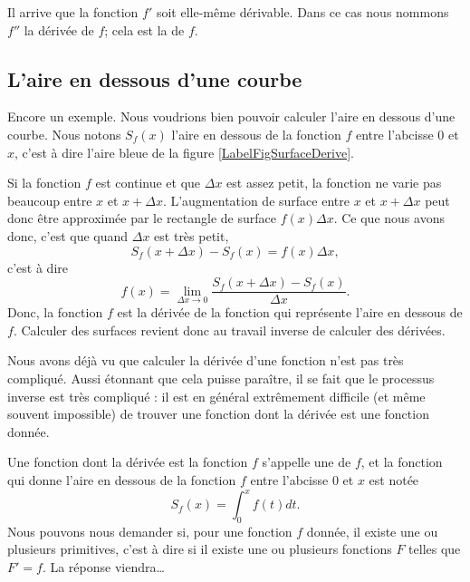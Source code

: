 Il arrive que la fonction $f'$ soit elle-même dérivable. Dans ce cas nous nommons $f''$ la dérivée de $f$; cela est la  de $f$.

\subsection{L'aire en dessous d'une courbe}		\label{SubSecAirePrimIntoOM}

Encore un exemple. Nous voudrions bien pouvoir calculer l'aire en dessous d'une courbe. Nous notons $S_f(x)$ l'aire en dessous de la fonction $f$ entre l'abcisse $0$ et $x$, c'est à dire l'aire bleue de la figure \ref{LabelFigSurfaceDerive}. 

\newcommand{\CaptionFigSurfaceDerive}{L'aire en dessous d'une courbe. Le rectangle rouge d'aire $f(x)\Delta x$ approxime de combien la surface augmente lorsqu'on passe de $x$ à $x+\Delta x$.}



Si la fonction $f$ est continue et que $\Delta x$ est assez petit, la fonction ne varie pas beaucoup entre $x$ et $x+\Delta x$. L'augmentation de surface entre $x$ et $x+\Delta x$ peut donc être approximée par le rectangle de surface $f(x)\Delta x$. Ce que nous avons donc, c'est que quand $\Delta x$ est très petit,
\begin{equation}
	S_f(x+\Delta x)-S_f(x)=f(x)\Delta x,
\end{equation}
c'est à dire
\begin{equation}
	f(x)=\lim_{\Delta x\to 0}\frac{  S_f(x+\Delta x)-S_f(x)}{ \Delta x }.
\end{equation}
Donc, la fonction $f$ est la dérivée de la fonction qui représente l'aire en dessous de $f$. Calculer des surfaces revient donc au travail inverse de calculer des dérivées.

Nous avons déjà vu que calculer la dérivée d'une fonction n'est pas très compliqué. Aussi étonnant que cela puisse paraître, il se fait que le processus inverse est très compliqué : il est en général extrêmement difficile (et même souvent impossible) de trouver une fonction dont la dérivée est une fonction donnée.

Une fonction dont la dérivée est la fonction $f$ s'appelle une  de $f$, et la fonction qui donne l'aire en dessous de la fonction $f$ entre l'abcisse $0$ et $x$ est notée
\begin{equation}
	S_f(x)=\int_0^xf(t)dt.
\end{equation}
Nous pouvons nous demander si, pour une fonction $f$ donnée, il existe une ou plusieurs primitives, c'est à dire si il existe une ou plusieurs fonctions $F$ telles que $F'=f$. La réponse viendra\ldots


